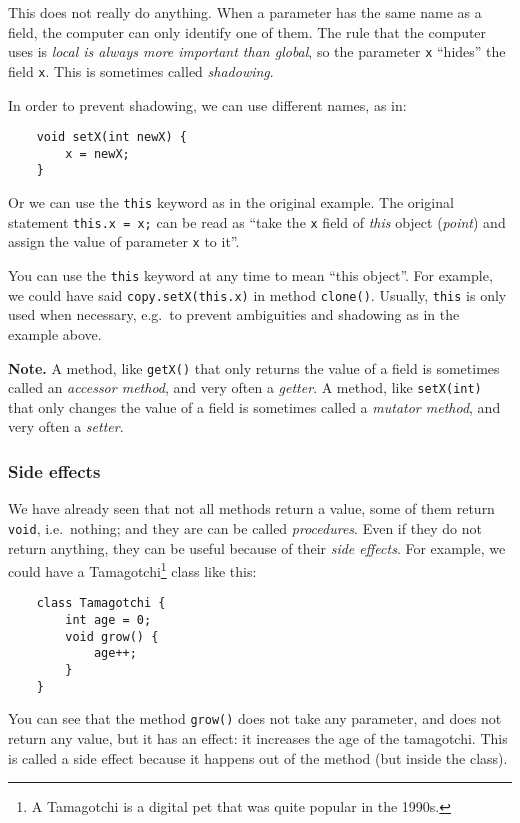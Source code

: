 This does not really do anything. When a parameter has the same name
as a field, the computer can only identify one of them. The rule that
the computer uses is \emph{local is always more important than
  global}, so the parameter \verb+x+ ``hides'' the field
\verb+x+. This is sometimes called \emph{shadowing}. 

In order to prevent shadowing, we can use different names, as in: 

\begin{verbatim}
    void setX(int newX) {
        x = newX;
    }
\end{verbatim}

Or we can use the \verb+this+ keyword as in the original example. The
original statement \verb+this.x = x;+ can be read as ``take the
\verb+x+ field of \emph{this} object (\emph{point}) and
assign the value of parameter \verb+x+ to it''. 

You can use the \verb+this+ keyword at any time to mean ``this
object''. For example, we could have said \verb+copy.setX(this.x)+ in
method \verb+clone()+. Usually, \verb+this+ is only used when necessary,
e.g.~to prevent ambiguities and shadowing as in the example above. 

\textbf{Note.} A method, like \verb+getX()+ that only returns the
value of a field is 
sometimes called an \emph{accessor method}, and very often a
\emph{getter}. A method, 
like \verb+setX(int)+ that only changes the
value of a field is 
sometimes called a \emph{mutator method}, and very often a
\emph{setter}. 

\subsubsection*{Side effects}
\label{sec:side-effects}

We have already seen that not all methods return a value, some of them
return \verb+void+, i.e.~nothing; and they are can be called
\emph{procedures}. Even if they do not return anything, they can be useful
because of their \emph{side effects}. For example, we could have a
Tamagotchi\footnote{A Tamagotchi is a digital pet that was quite
  popular in the 1990s.} class like this: 

\begin{verbatim}
    class Tamagotchi {
        int age = 0;
        void grow() {
            age++;
        }
    }
\end{verbatim}

You can see that the method \verb+grow()+ does not take any parameter,
and does not return any value, but it has an effect: it increases the
age of the tamagotchi. This is called a side effect because it happens
out of the method (but inside the class). 

